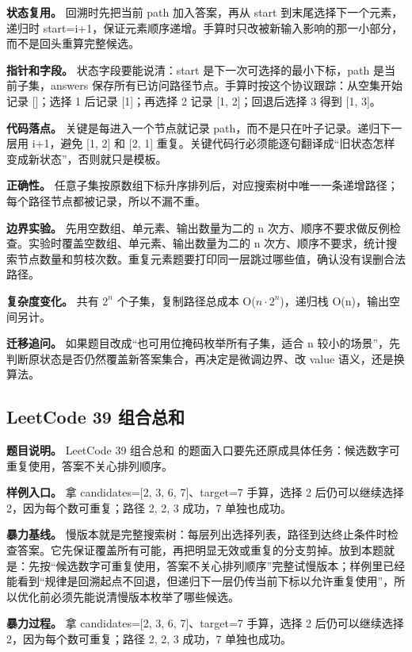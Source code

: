 \textbf{状态复用。} 回溯时先把当前 path 加入答案，再从 start 到末尾选择下一个元素，递归时 start=i+1，保证元素顺序递增。手算时只改被新输入影响的那一小部分，而不是回头重算完整候选。

\textbf{指针和字段。} 状态字段要能说清：start 是下一次可选择的最小下标，path 是当前子集，answers 保存所有已访问路径节点。手算时按这个协议跟踪：从空集开始记录 []；选择 1 后记录 [1]；再选择 2 记录 [1, 2]；回退后选择 3 得到 [1, 3]。

\textbf{代码落点。} 关键是每进入一个节点就记录 path，而不是只在叶子记录。递归下一层用 i+1，避免 [1, 2] 和 [2, 1] 重复。关键代码行必须能逐句翻译成“旧状态怎样变成新状态”，否则就只是模板。

\textbf{正确性。} 任意子集按原数组下标升序排列后，对应搜索树中唯一一条递增路径；每个路径节点都被记录，所以不漏不重。

\textbf{边界实验。} 先用空数组、单元素、输出数量为二的 n 次方、顺序不要求做反例检查。实验时覆盖空数组、单元素、输出数量为二的 n 次方、顺序不要求，统计搜索节点数量和剪枝次数。重复元素题要打印同一层跳过哪些值，确认没有误删合法路径。

\textbf{复杂度变化。} 共有 \ensuremath{2^{n}} 个子集，复制路径总成本 O(\ensuremath{n \cdot 2^{n}})，递归栈 O(n)，输出空间另计。

\textbf{迁移追问。} 如果题目改成“也可用位掩码枚举所有子集，适合 n 较小的场景”，先判断原状态是否仍然覆盖新答案集合，再决定是微调边界、改 value 语义，还是换算法。

\subsection{LeetCode 39 组合总和}

\textbf{题目说明。} LeetCode 39 组合总和 的题面入口要先还原成具体任务：候选数字可重复使用，答案不关心排列顺序。

\textbf{样例入口。} 拿 candidates=[2, 3, 6, 7]、target=7 手算，选择 2 后仍可以继续选择 2，因为每个数可重复；路径 2, 2, 3 成功，7 单独也成功。

\textbf{暴力基线。} 慢版本就是完整搜索树：每层列出选择列表，路径到达终止条件时检查答案。它先保证覆盖所有可能，再把明显无效或重复的分支剪掉。放到本题就是：先按“候选数字可重复使用，答案不关心排列顺序”完整试慢版本；样例里已经能看到“规律是回溯起点不回退，但递归下一层仍传当前下标以允许重复使用”，所以优化前必须先能说清慢版本枚举了哪些候选。

\textbf{暴力过程。} 拿 candidates=[2, 3, 6, 7]、target=7 手算，选择 2 后仍可以继续选择 2，因为每个数可重复；路径 2, 2, 3 成功，7 单独也成功。

